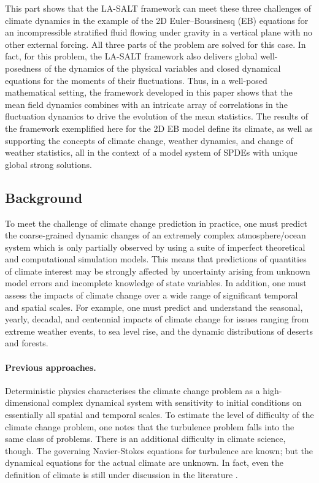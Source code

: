 \documentclass[11pt, oneside]{article}   	%
\numberwithin{equation}{section}
\theoremstyle{plain}
\theoremstyle{definition}
\theoremstyle{remark}
\newcommand{\<}{\langle}
\renewcommand{\>}{\rangle}
\begin{document}
This part shows that the LA-SALT framework can meet these three challenges of climate dynamics in the example of   
the 2D Euler--Boussinesq (EB) equations for an incompressible stratified fluid flowing under gravity in a vertical plane with no other external forcing. 
All three parts of the problem are solved for this case. In fact, for this problem, the LA-SALT framework also delivers global 
well-posedness of the dynamics 
of the physical variables and closed dynamical equations for the moments of their fluctuations. 
Thus, in a well-posed mathematical setting, the framework developed in this paper shows that the mean field dynamics combines 
with an intricate array of correlations in the fluctuation dynamics to drive the evolution of the mean statistics. 
The results of the framework exemplified here for the 2D EB model define its climate, as well as supporting 
the concepts of climate change, weather dynamics, and change of weather statistics, 
all in the context of a model system of SPDEs with unique global strong solutions. 
  


\subsection{Background} To meet the challenge of climate change prediction in practice, one must predict the coarse-grained dynamic changes of an extremely complex atmosphere/ocean system which is only partially observed by using a suite of imperfect theoretical and computational simulation models. This means that predictions of quantities of climate interest may be strongly affected by uncertainty arising from unknown model errors and incomplete knowledge of state variables. In addition, one must assess the impacts of climate change over a wide range of significant temporal and spatial scales. For example, one must predict and understand the seasonal, yearly, decadal, and centennial impacts of climate change for issues ranging from extreme weather events, to sea level rise, and the dynamic distributions of deserts and forests.

\paragraph{\bf Previous approaches.} Deterministic physics characterises the climate change problem as a high-dimensional complex dynamical system with sensitivity to initial conditions on essentially all spatial and temporal scales. To estimate the level of difficulty of the climate change problem, one notes that the turbulence problem falls into the same class of problems. There is an additional difficulty in climate science, though. The governing Navier-Stokes equations for turbulence are known; but  the dynamical equations for the actual climate are unknown. In fact, even the definition of climate is still under discussion in the literature \cite{Bothe2018}.  
\end{document}
